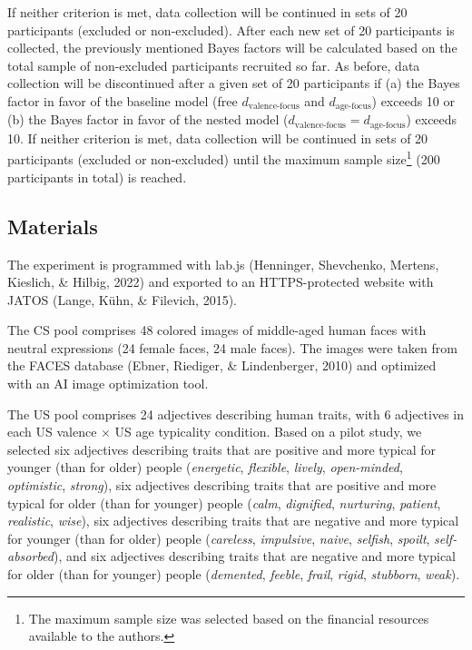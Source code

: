 \documentclass[
  doc,floatsintext]{apa6}
\begin{document}
If neither criterion is met, data collection will be continued in sets of 20 participants (excluded or non-excluded).
After each new set of 20 participants is collected, the previously mentioned Bayes factors will be calculated based on the total sample of non-excluded participants recruited so far.
As before, data collection will be discontinued after a given set of 20 participants if (a) the Bayes factor in favor of the baseline model (free \(d_\textrm{valence-focus}\) and \(d_\textrm{age-focus}\)) exceeds 10 or (b)
the Bayes factor in favor of the nested model (\(d_\textrm{valence-focus}=d_\textrm{age-focus}\)) exceeds 10.
If neither criterion is met, data collection will be continued in sets of 20 participants (excluded or non-excluded) until the maximum sample size\footnote{The maximum sample size was selected based on the financial resources available to the authors.} (200 participants in total) is reached.

\hypertarget{materials}{%
\subsection{Materials}\label{materials}}

The experiment is programmed with lab.js (Henninger, Shevchenko, Mertens, Kieslich, \& Hilbig, 2022) and exported to an HTTPS-protected website with JATOS (Lange, Kühn, \& Filevich, 2015).

The CS pool comprises 48 colored images of middle-aged human faces with neutral expressions (24 female faces, 24 male faces).
The images were taken from the FACES database (Ebner, Riediger, \& Lindenberger, 2010) and optimized with an AI image optimization tool.

The US pool comprises 24 adjectives describing human traits, with 6 adjectives in each US valence \(\times\) US age typicality condition.
Based on a pilot study, we selected six adjectives describing traits that are positive and more typical for younger (than for older) people (\emph{energetic}, \emph{flexible}, \emph{lively}, \emph{open-minded}, \emph{optimistic}, \emph{strong}), six adjectives describing traits that are positive and more typical for older (than for younger) people (\emph{calm}, \emph{dignified}, \emph{nurturing}, \emph{patient}, \emph{realistic}, \emph{wise}), six adjectives describing traits that are negative and more typical for younger (than for older) people (\emph{careless}, \emph{impulsive}, \emph{naive}, \emph{selfish}, \emph{spoilt}, \emph{self-absorbed}), and six adjectives describing traits that are negative and more typical for older (than for younger) people (\emph{demented}, \emph{feeble}, \emph{frail}, \emph{rigid}, \emph{stubborn}, \emph{weak}).
\end{document}
